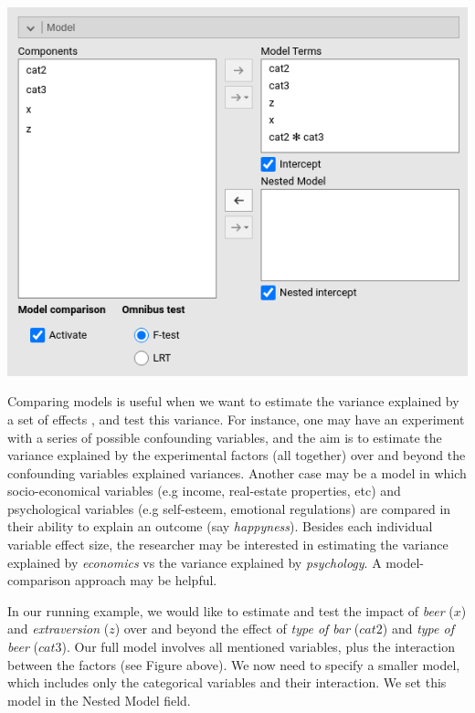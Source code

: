 \documentclass[
]{book}
\begin{document}
\includegraphics[width=7.82in]{bookletpics/2_modelcomparison_input1}

Comparing models is useful when we want to estimate the variance explained by a set of effects \citep{cohen2014applied}, and test this variance. For instance, one may have an experiment with a series of possible confounding variables, and the aim is to estimate the variance explained by the experimental factors (all together) over and beyond the confounding variables explained variances. Another case may be a model in which socio-economical variables (e.g income, real-estate properties, etc) and psychological variables (e.g self-esteem, emotional regulations) are compared in their ability to explain an outcome (say \emph{happyness}). Besides each individual variable effect size, the researcher may be interested in estimating the variance explained by \emph{economics} vs the variance explained by \emph{psychology}. A model-comparison approach may be helpful.

In our running example, we would like to estimate and test the impact of \emph{beer} (\(x\)) and \emph{extraversion} (\(z\)) over and beyond the effect of \emph{type of bar} (\(cat2\)) and \emph{type of beer} (\(cat3\)). Our full model involves all mentioned variables, plus the interaction between the factors (see Figure above). We now need to specify a smaller model, which includes only the categorical variables and their interaction. We set this model in the {Nested Model} field.
\end{document}
